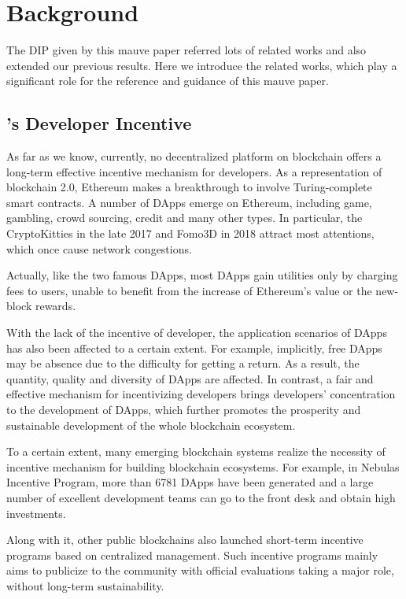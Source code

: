 \section{Background}
\label{sec:background}
The DIP given by this mauve paper referred  lots of related works and also extended our previous results. Here we introduce the related works, which play a significant role for the  reference and guidance of this mauve paper.

\subsection{\dapp's Developer Incentive}
As far as we know, currently, no decentralized platform on blockchain offers a long-term effective incentive mechanism for \dapp developers. As a representation of blockchain 2.0, Ethereum makes a breakthrough to involve Turing-complete smart contracts. A number of DApps emerge on Ethereum, including game, gambling, crowd sourcing, credit and many other types. In particular, the CryptoKitties in the late 2017 and Fomo3D in 2018 attract most attentions, which once cause network congestions.

Actually, like the two famous DApps, most DApps gain utilities only by charging
fees to users, unable to benefit from the increase of Ethereum's value or the
new-block rewards.

With the lack of the incentive of developer, the application scenarios of DApps
has also been affected to a certain extent. For example, implicitly, free DApps
may be absence due to the difficulty for getting a return. As a result, the
quantity, quality and diversity of DApps are affected. In contrast, a fair and
effective mechanism for incentivizing developers brings developers'
concentration to the development of DApps, which further promotes the prosperity and sustainable development of the whole blockchain ecosystem.

To a certain extent, many emerging blockchain systems realize the necessity of incentive mechanism for building blockchain ecosystems. For example, in Nebulas Incentive Program, more than 6781 DApps have been generated and a large number of excellent development teams can go to the front desk and obtain high investments.

Along with it, other public blockchains also launched short-term incentive programs based on centralized management. Such incentive programs mainly aims to publicize to the community with official evaluations taking a major role, without long-term sustainability.


